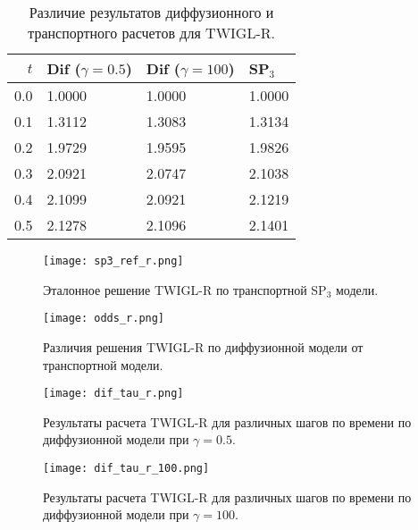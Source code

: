 \documentclass[a4paper,12pt]{article}
\begin{document}
\begin{table}[htp]
\caption{Различие результатов диффузионного и транспортного расчетов для TWIGL-R.}
\label{table:twigl-r}
\begin{center}
\begin{tabular}{r R{2.5cm} R{2.5cm} R{2.5cm}}
\hline
$t$ & Dif ($\gamma=0.5$) & Dif ($\gamma=100$) & SP$_3$\\
 & 1.0000 & 1.0000 & 1.0000\\
0.1 & 1.3112  & 1.3083 & 1.3134\\
0.2 & 1.9729 & 1.9595 & 1.9826\\
0.3 & 2.0921 & 2.0747 & 2.1038\\
0.4 & 2.1099 & 2.0921 & 2.1219\\
0.5 & 2.1278 & 2.1096 & 2.1401\\
\hline
\end{tabular}
\end{center}
\end{table}

\begin{figure}[htp]
\begin{center}
	\texttt{[image: sp3\_ref\_r.png]}\\
	\caption{\label{image:canonsummary} Эталонное решение TWIGL-R по транспортной SP$_3$ модели.}
	\label{ris:sp3_ref_r}
\end{center}
\end{figure}

\begin{figure}[htp]
\begin{center}
	\texttt{[image: odds\_r.png]}\\
	\caption{\label{image:canonsummary} Различия решения TWIGL-R по диффузионной модели от транспортной модели.}
	\label{ris:odds_r}
\end{center}
\end{figure}

\begin{figure}[htp]
\begin{center}
	\texttt{[image: dif\_tau\_r.png]}\\
	\caption{\label{image:canonsummary}Результаты расчета TWIGL-R для различных шагов по времени по диффузионной модели при $\gamma=0.5$.}
	\label{ris:dif_tau_r_0.5}
\end{center}
\end{figure}

\begin{figure}[htp]
\begin{center}
	\texttt{[image: dif\_tau\_r\_100.png]}\\
	\caption{\label{image:canonsummary}Результаты расчета TWIGL-R для различных шагов по времени по диффузионной модели при $\gamma=100$.}
	\label{ris:dif_tau_r_100}
\end{center}
\end{figure}
\end{document}
